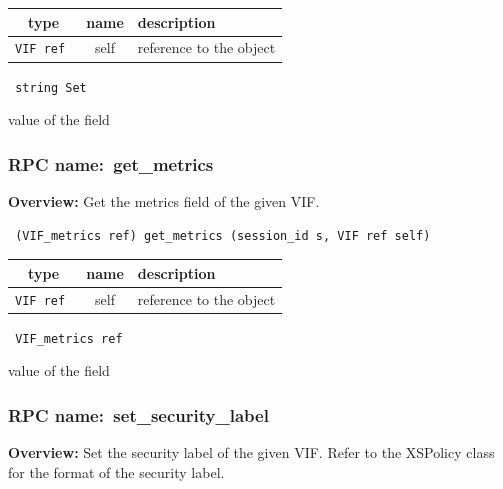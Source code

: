  
\vspace{0.3cm}
\begin{tabular}{|c|c|p{7cm}|}
 \hline
{\bf type} & {\bf name} & {\bf description} \\ \hline
{\tt VIF ref } & self & reference to the object \\ \hline 

\end{tabular}

\vspace{0.3cm}

{\tt 
string Set
}


value of the field
\vspace{0.3cm}
\vspace{0.3cm}
\vspace{0.3cm}
\subsubsection{RPC name:~get\_metrics}

{\bf Overview:} 
Get the metrics field of the given VIF.

\begin{verbatim} (VIF_metrics ref) get_metrics (session_id s, VIF ref self)\end{verbatim}



 
\vspace{0.3cm}
\begin{tabular}{|c|c|p{7cm}|}
 \hline
{\bf type} & {\bf name} & {\bf description} \\ \hline
{\tt VIF ref } & self & reference to the object \\ \hline 

\end{tabular}

\vspace{0.3cm}

{\tt 
VIF\_metrics ref
}


value of the field
\vspace{0.3cm}
\vspace{0.3cm}
\vspace{0.3cm}
\subsubsection{RPC name:~set\_security\_label}

{\bf Overview:}
Set the security label of the given VIF. Refer to the XSPolicy class
for the format of the security label.

